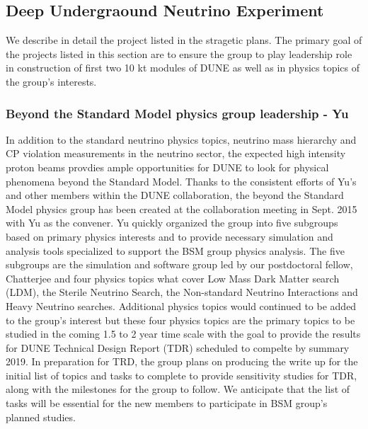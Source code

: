 \subsection{Deep Undergraound Neutrino Experiment}\label{ss:dune}
We describe in detail the project listed in the stragetic plans.   The primary goal of the projects listed in this section are to ensure
the group to play leadership role in construction of first two 10 kt modules of DUNE as well as in physics topics of the group's 
interests.  
%
%
\subsubsection {Beyond the Standard Model physics group leadership - Yu}
In addition to the standard neutrino physics topics, neutrino mass hierarchy and CP violation measurements in the neutrino sector, the 
expected high intensity proton beams provdies ample opportunities for DUNE to look for physical phenomena beyond the Standard Model.
Thanks to the consistent efforts of Yu's and other members within the DUNE collaboration, the beyond the Standard Model physics group 
has been created at the collaboration meeting in Sept. 2015 with Yu as the convener.
Yu quickly organized the group into five subgroups based on primary physics interests and to provide necessary
simulation and analysis tools specialized to support the BSM group physics analysis.
The five subgroups are the simulation and software group led by our postdoctoral fellow, Chatterjee and four physics topics what cover
Low Mass Dark Matter search (LDM), the Sterile Neutrino Search, the Non-standard Neutrino Interactions and Heavy Neutrino searches.
Additional physics topics would continued to be added to the group's interest but these four physics topics are the primary topics to be
studied in the coming 1.5 to 2 year time scale with the goal to provide the results for DUNE Technical Design Report (TDR) scheduled to compelte
by summary 2019.
In preparation for TRD, the group plans on producing the write up for the initial list of topics and tasks to complete to provide
sensitivity studies for TDR, along with the milestones for the group to follow.
We anticipate that the list of tasks will be essential for the new members to participate in BSM group's planned studies.
%
%
